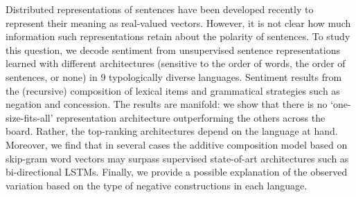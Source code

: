 Distributed representations of sentences have been developed recently to represent their meaning as real-valued vectors. However, it is not clear how much information such representations retain about the polarity of sentences. To study this question, we decode sentiment from unsupervised sentence representations learned with different architectures (sensitive to the order of words, the order of sentences, or none) in 9 typologically diverse languages. Sentiment results from the (recursive) composition of lexical items and grammatical strategies such as negation and concession. The results are manifold: we show that there is no `one-size-fits-all' representation architecture outperforming the others across the board. Rather, the top-ranking architectures depend on the language at hand. Moreover, we find that in several cases the additive composition model based on skip-gram word vectors may surpass supervised state-of-art architectures such as bi-directional LSTMs. Finally, we provide a possible explanation of the observed variation based on the type of negative constructions in each language.

